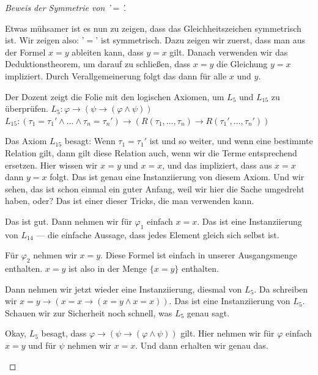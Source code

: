 \begin{proof}[Beweis der Symmetrie von '$=$']
\begin{spoken-clean}[00:55:30 - 00:56:17]
Etwas mühsamer ist es nun zu zeigen, dass das Gleichheitszeichen symmetrisch ist. Wir zeigen also: '$=$' ist symmetrisch. Dazu zeigen wir zuerst, dass man aus der Formel $x=y$ ableiten kann, dass $y=x$ gilt. Danach verwenden wir das Deduktionstheorem, um darauf zu schließen, dass $x=y$ die Gleichung $y=x$ impliziert. Durch Verallgemeinerung folgt das dann für alle $x$ und $y$.
\end{spoken-clean}

\begin{meta-note}
Der Dozent zeigt die Folie mit den logischen Axiomen, um $L_5$ und $L_{15}$ zu überprüfen.
$L_5: \varphi \to (\psi \to (\varphi \land \psi))$
$L_{15}: (\tau_1 = \tau_1' \land \dots \land \tau_n = \tau_n') \to (R(\tau_1, \dots, \tau_n) \to R(\tau_1', \dots, \tau_n'))$
\end{meta-note}

\begin{spoken-clean}[00:58:32 - 01:03:07]
Das Axiom $L_{15}$ besagt: Wenn $\tau_1 = \tau_1'$ ist und so weiter, und wenn eine bestimmte Relation gilt, dann gilt diese Relation auch, wenn wir die Terme entsprechend ersetzen. Hier wissen wir $x=y$ und $x=x$, und das impliziert, dass aus $x=x$ dann $y=x$ folgt. Das ist genau eine Instanziierung von diesem Axiom. Und wir sehen, das ist schon einmal ein guter Anfang, weil wir hier die Sache umgedreht haben, oder? Das ist einer dieser Tricks, die man verwenden kann.

Das ist gut. Dann nehmen wir für $\varphi_1$ einfach $x=x$. Das ist eine Instanziierung von $L_{14}$ --- die einfache Aussage, dass jedes Element gleich sich selbst ist. 

Für $\varphi_2$ nehmen wir $x=y$. Diese Formel ist einfach in unserer Ausgangsmenge enthalten. $x=y$ ist also in der Menge $\{x=y\}$ enthalten. 

Dann nehmen wir jetzt wieder eine Instanziierung, diesmal von $L_5$. Da schreiben wir $x=y \to (x=x \to (x=y \land x=x))$. Das ist eine Instanziierung von $L_5$. Schauen wir zur Sicherheit noch schnell, was $L_5$ genau sagt.

Okay, $L_5$ besagt, dass $\varphi \to (\psi \to (\varphi \land \psi))$ gilt. Hier nehmen wir für $\varphi$ einfach $x=y$ und für $\psi$ nehmen wir $x=x$. Und dann erhalten wir genau das.


\end{spoken-clean}
\end{proof}
